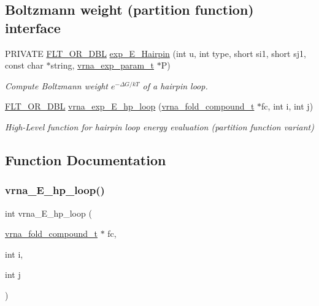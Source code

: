 \subsection*{Boltzmann weight (partition function) interface}
\begin{DoxyCompactItemize}
\item 
P\+R\+I\+V\+A\+TE \hyperlink{group__data__structures_ga31125aeace516926bf7f251f759b6126}{F\+L\+T\+\_\+\+O\+R\+\_\+\+D\+BL} \hyperlink{group__eval__loops__hp_ga51fb555974f180b78d76142b2894851c}{exp\+\_\+\+E\+\_\+\+Hairpin} (int u, int type, short si1, short sj1, const char $\ast$string, \hyperlink{group__energy__parameters_ga01d8b92fe734df8d79a6169482c7d8d8}{vrna\+\_\+exp\+\_\+param\+\_\+t} $\ast$P)
\begin{DoxyCompactList}\small\item\em Compute Boltzmann weight $e^{-\Delta G/kT} $ of a hairpin loop. \end{DoxyCompactList}\item 
\hyperlink{group__data__structures_ga31125aeace516926bf7f251f759b6126}{F\+L\+T\+\_\+\+O\+R\+\_\+\+D\+BL} \hyperlink{group__eval__loops__hp_gad62fe037be0a3fc6914676e5cb85be5e}{vrna\+\_\+exp\+\_\+\+E\+\_\+hp\+\_\+loop} (\hyperlink{group__fold__compound_ga1b0cef17fd40466cef5968eaeeff6166}{vrna\+\_\+fold\+\_\+compound\+\_\+t} $\ast$fc, int i, int j)
\begin{DoxyCompactList}\small\item\em High-\/\+Level function for hairpin loop energy evaluation (partition function variant) \end{DoxyCompactList}\end{DoxyCompactItemize}


\subsection{Function Documentation}
\mbox{\label{group__eval__loops__hp_ga57179ea326cc5ed8dfe4d3962b233128}} 
\subsubsection{\texorpdfstring{vrna\+\_\+\+E\+\_\+hp\+\_\+loop()}{vrna\_E\_hp\_loop()}}
{\footnotesize\ttfamily int vrna\+\_\+\+E\+\_\+hp\+\_\+loop (\begin{DoxyParamCaption}\item[{\hyperlink{group__fold__compound_ga1b0cef17fd40466cef5968eaeeff6166}{vrna\+\_\+fold\+\_\+compound\+\_\+t} $\ast$}]{fc,  }\item[{int}]{i,  }\item[{int}]{j }\end{DoxyParamCaption})}



